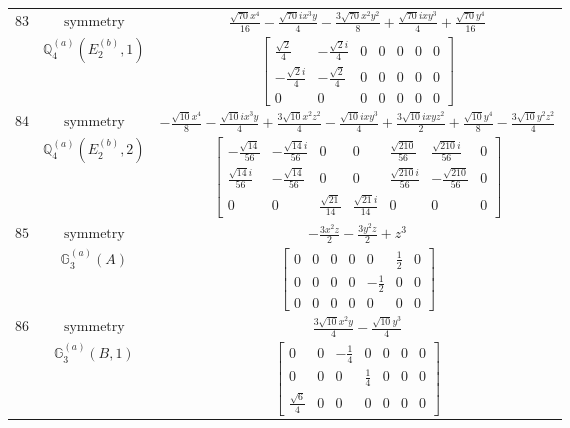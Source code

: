 \documentclass[fleqn,8pt,landscape]{jsarticle}
\begin{document}
\begin{longtable}{ccc}
$ 83 $ & $ \text{symmetry} $ & $ \frac{\sqrt{70} x^{4}}{16} - \frac{\sqrt{70} i x^{3} y}{4} - \frac{3 \sqrt{70} x^{2} y^{2}}{8} + \frac{\sqrt{70} i x y^{3}}{4} + \frac{\sqrt{70} y^{4}}{16} $ \\
$  $ & $ \mathbb{Q}_{4}^{(a)}(E_{2}^{(b)},1) $ & $ \begin{bmatrix} \frac{\sqrt{2}}{4} & - \frac{\sqrt{2} i}{4} & 0 & 0 & 0 & 0 & 0 \\ - \frac{\sqrt{2} i}{4} & - \frac{\sqrt{2}}{4} & 0 & 0 & 0 & 0 & 0 \\ 0 & 0 & 0 & 0 & 0 & 0 & 0 \end{bmatrix} $ \\ \hline
$ 84 $ & $ \text{symmetry} $ & $ - \frac{\sqrt{10} x^{4}}{8} - \frac{\sqrt{10} i x^{3} y}{4} + \frac{3 \sqrt{10} x^{2} z^{2}}{4} - \frac{\sqrt{10} i x y^{3}}{4} + \frac{3 \sqrt{10} i x y z^{2}}{2} + \frac{\sqrt{10} y^{4}}{8} - \frac{3 \sqrt{10} y^{2} z^{2}}{4} $ \\
$  $ & $ \mathbb{Q}_{4}^{(a)}(E_{2}^{(b)},2) $ & $ \begin{bmatrix} - \frac{\sqrt{14}}{56} & - \frac{\sqrt{14} i}{56} & 0 & 0 & \frac{\sqrt{210}}{56} & \frac{\sqrt{210} i}{56} & 0 \\ \frac{\sqrt{14} i}{56} & - \frac{\sqrt{14}}{56} & 0 & 0 & \frac{\sqrt{210} i}{56} & - \frac{\sqrt{210}}{56} & 0 \\ 0 & 0 & \frac{\sqrt{21}}{14} & \frac{\sqrt{21} i}{14} & 0 & 0 & 0 \end{bmatrix} $ \\ \hline
$ 85 $ & $ \text{symmetry} $ & $ - \frac{3 x^{2} z}{2} - \frac{3 y^{2} z}{2} + z^{3} $ \\
$  $ & $ \mathbb{G}_{3}^{(a)}(A) $ & $ \begin{bmatrix} 0 & 0 & 0 & 0 & 0 & \frac{1}{2} & 0 \\ 0 & 0 & 0 & 0 & - \frac{1}{2} & 0 & 0 \\ 0 & 0 & 0 & 0 & 0 & 0 & 0 \end{bmatrix} $ \\ \hline
$ 86 $ & $ \text{symmetry} $ & $ \frac{3 \sqrt{10} x^{2} y}{4} - \frac{\sqrt{10} y^{3}}{4} $ \\
$  $ & $ \mathbb{G}_{3}^{(a)}(B,1) $ & $ \begin{bmatrix} 0 & 0 & - \frac{1}{4} & 0 & 0 & 0 & 0 \\ 0 & 0 & 0 & \frac{1}{4} & 0 & 0 & 0 \\ \frac{\sqrt{6}}{4} & 0 & 0 & 0 & 0 & 0 & 0 \end{bmatrix} $ \\ \hline

\end{longtable}
\end{document}
